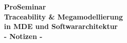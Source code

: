 \documentclass[a4paper]{scrartcl}
\begin{document}
\begin{center}
\Huge\textbf{ProSeminar}
\\
\LARGE\textbf{Traceability \& Megamodellierung\\in MDE und Softwararchitektur}
\\
\Large\textbf{- Notizen -}
\end{center}

\tableofcontents








\end{document}

